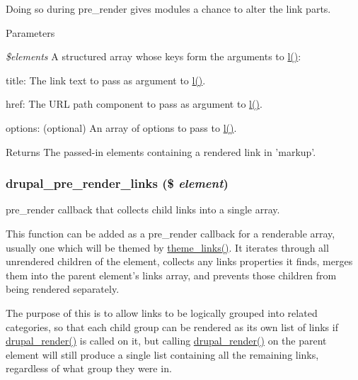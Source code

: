 Doing so during pre\_\-render gives modules a chance to alter the link parts.


\begin{DoxyParams}{Parameters}
\item[{\em \$elements}]A structured array whose keys form the arguments to \hyperlink{common_8inc_ad3b36c06dc46250b8d22b8d0d2e7bd97}{l()}:
\begin{DoxyItemize}
\item title: The link text to pass as argument to \hyperlink{common_8inc_ad3b36c06dc46250b8d22b8d0d2e7bd97}{l()}.
\item href: The URL path component to pass as argument to \hyperlink{common_8inc_ad3b36c06dc46250b8d22b8d0d2e7bd97}{l()}.
\item options: (optional) An array of options to pass to \hyperlink{common_8inc_ad3b36c06dc46250b8d22b8d0d2e7bd97}{l()}.
\end{DoxyItemize}\end{DoxyParams}
\begin{DoxyReturn}{Returns}
The passed-\/in elements containing a rendered link in 'markup'. 
\end{DoxyReturn}
\hypertarget{common_8inc_a678780979d6d69c92710d392004411ff}{
\subsubsection[{drupal\_\-pre\_\-render\_\-links}]{\setlength{\rightskip}{0pt plus 5cm}drupal\_\-pre\_\-render\_\-links (\$ {\em element})}}
\label{common_8inc_a678780979d6d69c92710d392004411ff}
pre\_\-render callback that collects child links into a single array.

This function can be added as a pre\_\-render callback for a renderable array, usually one which will be themed by \hyperlink{group__themeable_gab75b290dbc9541e2fb0d9e57cbcdda5c}{theme\_\-links()}. It iterates through all unrendered children of the element, collects any links properties it finds, merges them into the parent element's links array, and prevents those children from being rendered separately.

The purpose of this is to allow links to be logically grouped into related categories, so that each child group can be rendered as its own list of links if \hyperlink{common_8inc_a05798b44e8d6c496d4bee5cc32fa7851}{drupal\_\-render()} is called on it, but calling \hyperlink{common_8inc_a05798b44e8d6c496d4bee5cc32fa7851}{drupal\_\-render()} on the parent element will still produce a single list containing all the remaining links, regardless of what group they were in.

